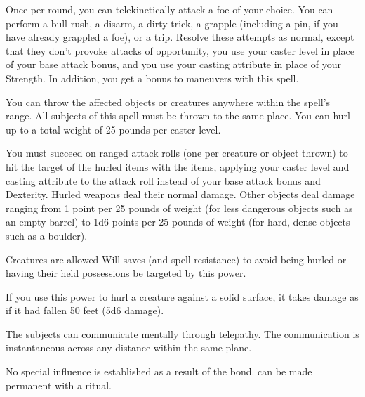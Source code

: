\spellrng{\rngmed}
\begin{spelleffect}
  Once per round, you can telekinetically attack a foe of your choice. You can perform a bull rush, a disarm, a dirty trick, a grapple (including a pin, if you have already grappled a foe), or a trip. Resolve these attempts as normal, except that they don't provoke attacks of opportunity, you use your caster level in place of your base attack bonus, and you use your casting attribute in place of your Strength. In addition, you get a  bonus to maneuvers with this spell. \bonusscalingdescription
\end{spelleffect}

\spellrng{\rngmed}
\begin{spelleffect}
  You can throw the affected objects or creatures anywhere within the spell's range. All subjects of this spell must be thrown to the same place. You can hurl up to a total weight of 25 pounds per caster level.
  \par You must succeed on ranged attack rolls (one per creature or object thrown) to hit the target of the hurled items with the items, applying your caster level and casting attribute to the attack roll instead of your base attack bonus and Dexterity. Hurled weapons deal their normal damage. Other objects deal damage ranging from 1 point per 25 pounds of weight (for less dangerous objects such as an empty barrel) to 1d6 points per 25 pounds of weight (for hard, dense objects such as a boulder).
  \par Creatures are allowed Will saves (and spell resistance) to avoid being hurled or having their held possessions be targeted by this power.
  \par If you use this power to hurl a creature against a solid surface, it takes damage as if it had fallen 50 feet (5d6 damage).
\end{spelleffect}

\spellrng{\rngclose}
\begin{spelleffect}
  The subjects can communicate mentally through telepathy. The communication is instantaneous across any distance within the same plane.
\end{spelleffect}
\begin{spellnotes}
  No special influence is established as a result of the bond.  can be made permanent with a  ritual.
\end{spellnotes}

